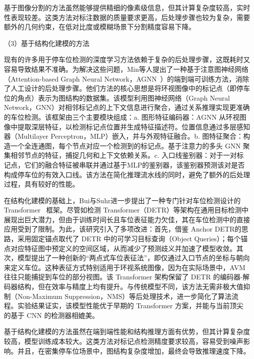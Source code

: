 基于图像分割的方法虽然能够提供精细的像素级信息，但其计算复杂度较高，实时性表现较差。这类方法对标注数据的质量要求更高，后处理步骤也较为复杂，需要额外的几何约束，在低对比度或模糊场景下分割精度容易下降。

（3）基于结构化建模的方法

现有的许多用于停车位检测的深度学习方法依赖于复杂的后处理步骤，这既耗时又容易导致结果不准确。为解决这些问题，Min等人\cite{min2021attentional}提出了一种基于注意图神经网络（Attention-based Graph Neural Network，AGNN~\cite{thekumparampil2018attention}）的端到端可训练方法，消除了人工设计的后处理步骤。他们方法的核心思想是将环视图像中的标记点（即停车位的角点）表示为图结构的数据集。该模型利用图神经网络（Graph Neural Network，GNN\cite{scarselli2008graph}）对相邻标记点的上下文信息进行聚合，通过关系推理实现更准确的车位检测。该框架由三个主要模块组成：a. 图形特征编码器：AGNN 从环视图像中提取深层特征，以检测标记点位置并生成特征描述符。位置信息通过多层感知器（Multilayer Perceptron，MLP）嵌入，并与外观特征融合。b. 图特征聚合：构造一个全连通图，每个节点对应一个检测到的标记点。基于注意力的多头 GNN 聚集相邻节点的特征，捕捉几何和上下文依赖关系。c. 入口线鉴别器：对于一对标记点，它们的融合特征被串联并通过基于MLP的鉴别器，该鉴别器预测该对是否构成停车位的有效入口线。该方法在简化推理流水线的同时，避免了额外的后处理过程，具有较好的性能。

在结构化建模的基础上，Bui与Suhr\cite{bui2023transformer}进一步提出了一种专门针对车位检测设计的 Transformer~\cite{vaswani2017attention} 框架。尽管如检测 Transformer（DETR\cite{carion2020end}）等架构在通用目标检测中展现出巨大潜力，但由于训练时间长且车位表征能力欠佳，其在车位检测中的直接应用受到了限制。为此，该研究引入了多项改进：首先，借鉴 Anchor DETR\cite{wang2022anchor}的思路，采用固定锚点取代了 DETR 中的可学习目标查询（Object Queries）；每个锚点对应特征图中预定义的空间区域，从而减少了预测歧义并加速了模型收敛。其次，模型提出了一种创新的“两点式车位表征法”，即仅通过入口节点的坐标与朝向来定义车位。这种表征方式特别适用于环视系统图像，因为在实际场景中，AVM 往往只能捕捉到车位的部分视图。该 Transformer 架构保留了 DETR 的编码器-解码器结构，但在效率与精度上均有提升。与传统模型不同，该方法无需非极大值抑制（Non-Maximum Suppression，NMS）等后处理技术，进一步简化了算法流程。实验结果证实，该模型性能优于早期的 Transformer 方案，并能与当前顶尖的基于 CNN 的检测器相媲美。

基于结构化建模的方法虽然在端到端性能和结构推理方面有优势，但其计算复杂度较高，模型训练成本较大。这类方法对标记点检测精度要求较高，容易受到噪声影响。并且，在密集停车位场景中，图结构复杂度增加，最终会导致推理速度下降。




